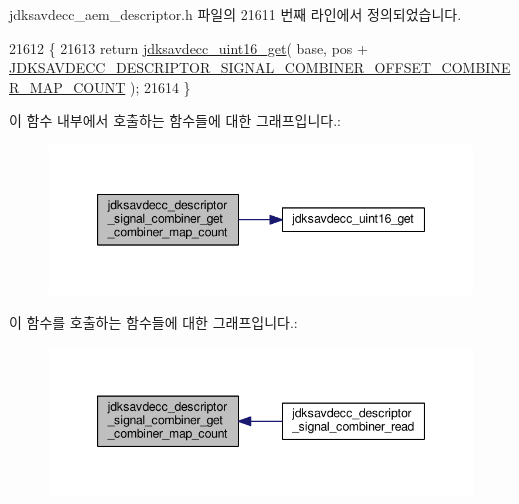 jdksavdecc\+\_\+aem\+\_\+descriptor.\+h 파일의 21611 번째 라인에서 정의되었습니다.


\begin{DoxyCode}
21612 \{
21613     \textcolor{keywordflow}{return} \hyperlink{group__endian_ga3fbbbc20be954aa61e039872965b0dc9}{jdksavdecc\_uint16\_get}( base, pos + 
      \hyperlink{group__descriptor__signal__combiner_ga4e808e837a1d968784975c179e2b4d8b}{JDKSAVDECC\_DESCRIPTOR\_SIGNAL\_COMBINER\_OFFSET\_COMBINER\_MAP\_COUNT}
       );
21614 \}
\end{DoxyCode}


이 함수 내부에서 호출하는 함수들에 대한 그래프입니다.\+:
\nopagebreak
\begin{figure}[H]
\begin{center}
\leavevmode
\includegraphics[width=347pt]{group__descriptor__signal__combiner_gadd2493df0c6bf2a2d504206a637e1903_cgraph}
\end{center}
\end{figure}




이 함수를 호출하는 함수들에 대한 그래프입니다.\+:
\nopagebreak
\begin{figure}[H]
\begin{center}
\leavevmode
\includegraphics[width=347pt]{group__descriptor__signal__combiner_gadd2493df0c6bf2a2d504206a637e1903_icgraph}
\end{center}
\end{figure}


